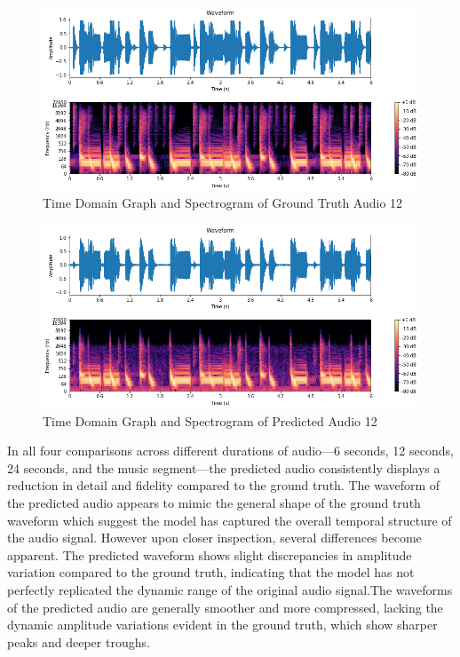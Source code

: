 \documentclass{ioereport}
\begin{document}
    \begin{figure}[H]
        \centering
        \includegraphics[width=\linewidth]{assets/audio_results/music.png}
        \caption{Time Domain Graph and Spectrogram of Ground Truth Audio 12}
        \label{fig:gt-music-spec}
    \end{figure}
    
    \begin{figure}[H]
        \centering
        \includegraphics[width=\linewidth]{assets/audio_results/musicpred.png}
        \caption{Time Domain Graph and Spectrogram of Predicted Audio 12}
        \label{fig:pred-music-spec}
    \end{figure}

    
    In all four comparisons across different durations of audio—6 seconds, 12 seconds, 24 seconds, and the music segment—the predicted audio consistently displays a reduction in detail and fidelity compared to the ground truth. The waveform of the predicted audio appears to mimic the general shape of the ground truth waveform which suggest the model has captured the overall temporal structure of the audio signal. However upon closer inspection, several differences become apparent. The predicted waveform shows slight discrepancies in amplitude variation compared to the ground truth, indicating that the model has not perfectly replicated the dynamic range of the original audio signal.The waveforms of the predicted audio are generally smoother and more compressed, lacking the dynamic amplitude variations evident in the ground truth, which show sharper peaks and deeper troughs. 
    
\end{document}
